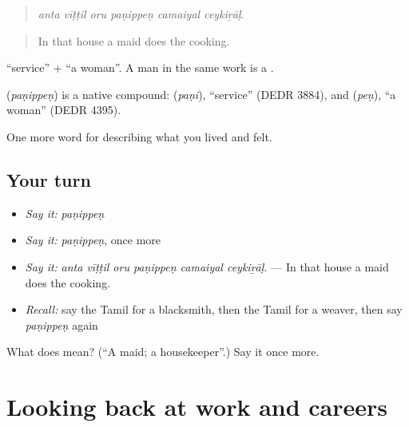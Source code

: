 \begin{quote}
\emph{anta vīṭṭil oru paṇippeṇ camaiyal ceykiṟāḷ.}
\end{quote}

\begin{quote}
In that house a maid does the cooking.
\end{quote}

 \textquotedblleft{}service\textquotedblright{} +  \textquotedblleft{}a woman\textquotedblright{}. A man in the same work is a .

\begin{cousinweb}
\textbf{} (\emph{paṇippeṇ}) is a native compound:  (\emph{paṇi}), \textquotedblleft{}service\textquotedblright{} (DEDR 3884), and  (\emph{peṇ}), \textquotedblleft{}a woman\textquotedblright{} (DEDR 4395).
\end{cousinweb}

\begin{grammarlens}[title={What you've built}]
One more word for describing what you lived and felt.
\end{grammarlens}

\subsection*{Your turn}
\begin{itemize}
\raggedright
  \item \emph{Say it:} \emph{paṇippeṇ}
  \item \emph{Say it:} \emph{paṇippeṇ}, once more
  \item \emph{Say it:} \emph{anta vīṭṭil oru paṇippeṇ camaiyal ceykiṟāḷ.} — In that house a maid does the cooking.
  \item \emph{Recall:} say the Tamil for a blacksmith, then the Tamil for a weaver, then say \emph{paṇippeṇ} again
\end{itemize}

\begin{tcolorbox}[breakable,colback=teal!4,colframe=teal!35!black,title={Before you move on}]
What does  mean? (\textquotedblleft{}A maid; a housekeeper\textquotedblright{}.) Say it once more.
\end{tcolorbox}
\section[(dialogue)]{Looking back at work and careers}

